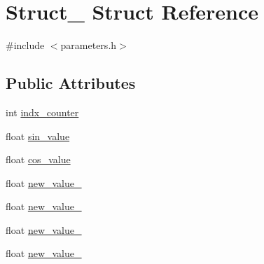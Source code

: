 \hypertarget{structStruct__2}{
\section{Struct\_ Struct Reference}
\label{structStruct__2}
}


{\ttfamily \#include $<$parameters.h$>$}

\subsection*{Public Attributes}
\begin{DoxyCompactItemize}
\item 
int \hyperlink{structStruct__2_a607d659ba63c564ccce86ac71b249db6}{indx\_\-counter}
\item 
float \hyperlink{structStruct__2_a145706c6b472fdaafa62e2b4b8da5888}{sin\_\-value}
\item 
float \hyperlink{structStruct__2_a9d87caa0748e84c9d015504e086b0d40}{cos\_\-value}
\item 
float \hyperlink{structStruct__2_ad98d34b42204b07fe1c2ce69366f9ff2}{new\_\-value\_}
\item 
float \hyperlink{structStruct__2_afd282d158493531b9adb48e6eecfdae1}{new\_\-value\_}
\item 
float \hyperlink{structStruct__2_a49587eb5408782fe456d674f11c7f8d8}{new\_\-value\_}
\item 
float \hyperlink{structStruct__2_adde82146aff2eb87c780b77e071b39ed}{new\_\-value\_}
\end{DoxyCompactItemize}


